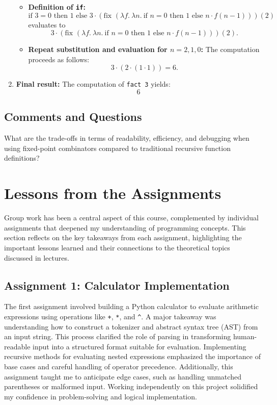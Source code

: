 \documentclass{article}
\theoremstyle{theorem}
\theoremstyle{definition}
\theoremstyle{remark}
\begin{document}
\begin{enumerate}
\begin{itemize}
        \item \textbf{Definition of \texttt{if}:}
        \[
        \text{if } 3 = 0 \text{ then } 1 \text{ else } 3 \cdot (\text{fix } (\lambda f.\ \lambda n.\ \text{if } n = 0 \text{ then } 1 \text{ else } n \cdot f (n-1)))(2)
        \]
        evaluates to
        \[
        3 \cdot (\text{fix } (\lambda f.\ \lambda n.\ \text{if } n = 0 \text{ then } 1 \text{ else } n \cdot f (n-1)))(2).
        \]

        \item \textbf{Repeat substitution and evaluation for \(n = 2, 1, 0\):}
        The computation proceeds as follows:
        \[
        3 \cdot (2 \cdot (1 \cdot 1)) = 6.
        \]
    \end{itemize}

    \item \textbf{Final result:} The computation of \texttt{fact 3} yields:
    \[
    \boxed{6}
    \]
\end{enumerate}


\subsection*{Comments and Questions}

What are the trade-offs in terms of readability, efficiency, and debugging when using fixed-point combinators compared to traditional recursive function definitions?

\section{Lessons from the Assignments}

Group work has been a central aspect of this course, complemented by individual assignments that deepened my understanding of programming concepts. This section reflects on the key takeaways from each assignment, highlighting the important lessons learned and their connections to the theoretical topics discussed in lectures.

\subsection{Assignment 1: Calculator Implementation}
The first assignment involved building a Python calculator to evaluate arithmetic expressions using operations like \texttt{+}, \texttt{*}, and \texttt{\^}. A major takeaway was understanding how to construct a tokenizer and abstract syntax tree (AST) from an input string. This process clarified the role of parsing in transforming human-readable input into a structured format suitable for evaluation. Implementing recursive methods for evaluating nested expressions emphasized the importance of base cases and careful handling of operator precedence. Additionally, this assignment taught me to anticipate edge cases, such as handling unmatched parentheses or malformed input. Working independently on this project solidified my confidence in problem-solving and logical implementation.
\end{document}
